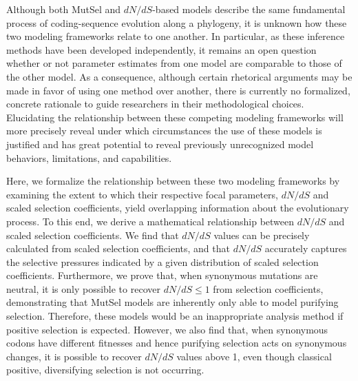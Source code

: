 \documentclass{pnastwo}
\begin{document}
\begin{article}
Although both MutSel and $dN/dS$-based models describe the same fundamental process of coding-sequence evolution along a phylogeny, it is unknown how these two modeling frameworks relate to one another. In particular, as these inference methods have been developed independently, it remains an open question whether or not parameter estimates from one model are comparable to those of the other model. As a consequence, although certain rhetorical arguments may be made in favor of using one method over another, there is currently no formalized, concrete rationale to guide researchers in their methodological choices. Elucidating the relationship between these competing modeling frameworks will more precisely reveal under which circumstances the use of these models is justified and has great potential to reveal previously unrecognized model behaviors, limitations, and capabilities.
		
Here, we formalize the relationship between these two modeling frameworks by examining the extent to which their respective focal parameters, $dN/dS$ and scaled selection coefficients, yield overlapping information about the evolutionary process. To this end, we derive a mathematical relationship between $dN/dS$ and scaled selection coefficients. We find that $dN/dS$ values can be precisely calculated from scaled selection coefficients, and that $dN/dS$ accurately captures the selective pressures indicated by a given distribution of scaled selection coefficients. Furthermore, we prove that, when synonymous mutations are neutral, it is only possible to recover $dN/dS \leq 1$ from selection coefficients, demonstrating that MutSel models are inherently only able to model purifying selection. Therefore, these models would be an inappropriate analysis method if positive selection is expected. However, we also find that, when synonymous codons have different fitnesses and hence purifying selection acts on synonymous changes, it is possible to recover $dN/dS$ values above 1, even though classical positive, diversifying selection is not occurring. 


\end{article}
\end{document}
